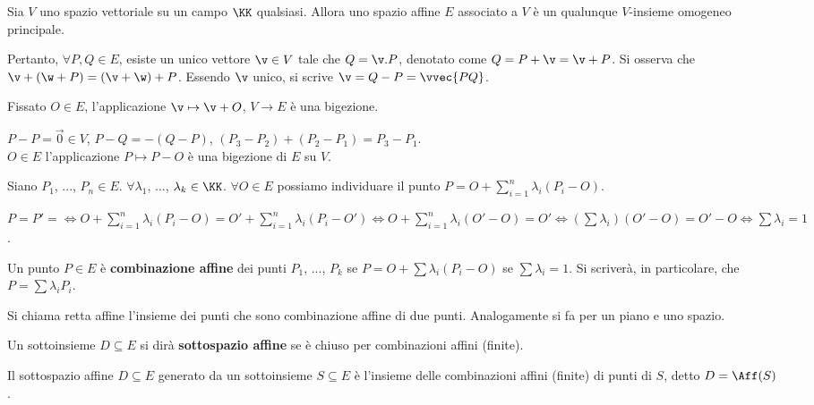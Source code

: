 \documentclass[11pt]{article}
\begin{document}
	\begin{definition} 
		Sia $V$ uno spazio vettoriale su un campo $\KK$ qualsiasi.
		Allora uno spazio affine $E$ associato a $V$ è un qualunque
		$V$-insieme omogeneo principale.
	\end{definition}

	Pertanto, $\forall P, Q \in E$, esiste un unico vettore $\v \in V$
	tale che $Q = \v . P $, denotato come $Q = P + \v = \v + P$. Si
	osserva che $\v + (\w + P) = (\v + \w) + P$. Essendo $\v$ unico,
	si scrive $\v = Q - P = \vvec{PQ}$.
	
	
	Fissato $O \in E$, l'applicazione $\v \mapsto \v + O$, $V \to E$
	è una bigezione.
	
	\begin{remark}\nl
		\li $P-P = \vec 0 \in V$, $P-Q = -(Q-P)$, $(P_3 - P_2) + (P_2 - P_1) = P_3 - P_1$. \\
		
		\li $O \in E$ l'applicazione $P \mapsto P-O$ è una bigezione di $E$
		su $V$.
	\end{remark}

	Siano $P_1$, ..., $P_n \in E$. $\forall \lambda_1$, ..., $\lambda_k \in \KK$. $\forall O \in E$ possiamo individuare il punto $P = O + \sum_{i=1}^n \lambda_i (P_i - O)$.
	
	$P = P' = \iff O + \sum_{i=1}^n \lambda_i (P_i - O) = O' + \sum_{i=1}^n \lambda_i (P_i - O') \iff O + \sum_{i=1}^n \lambda_i (O' - O) = O' \iff
	(\sum \lambda_i) (O' - O) = O' - O \iff \sum \lambda_i = 1$.
	
	\begin{definition}
		Un punto $P \in E$ è \textbf{combinazione affine} dei punti
		$P_1$, ..., $P_k$ se $P = O + \sum \lambda_i (P_i - O)$ se
		$\sum \lambda_i = 1$. Si scriverà, in particolare, che
		$P = \sum \lambda_i P_i$.
	\end{definition}

	Si chiama retta affine l'insieme dei punti che sono combinazione affine di
	due punti. Analogamente si fa per un piano e uno spazio.
	
	\begin{definition}
		Un sottoinsieme $D \subseteq E$ si dirà \textbf{sottospazio affine}
		se è chiuso per combinazioni affini (finite).
	\end{definition}

	\begin{definition}
		Il sottospazio affine $D \subseteq E$ generato da un sottoinsieme $S \subseteq E$ è l'insieme delle combinazioni affini (finite) di punti
		di $S$, detto $D = \Aff(S)$. %
	\end{definition}
\end{document}
